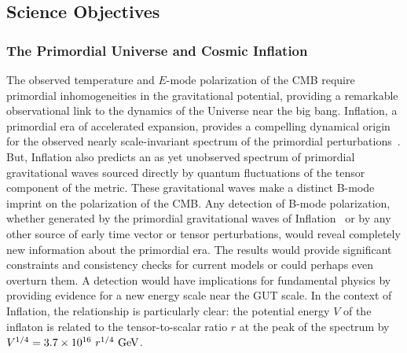 
\subsection{Science Objectives}
\label{sec:science}

\vspace{-0.05in}
 
\subsubsection{The Primordial Universe and Cosmic Inflation}

\vspace{-0.05in}

The observed temperature and $E$-mode polarization of the \ac{CMB} require primordial inhomogeneities in the 
gravitational potential, providing a remarkable observational link to the dynamics of the Universe near the big bang.
Inflation, a primordial era of accelerated expansion, provides a compelling 
dynamical origin for the observed nearly scale-invariant spectrum of the primordial perturbations~\cite{guth81,linde82,albrecht82,sato81,kolb94}. 
But, Inflation also predicts an as yet unobserved spectrum of primordial gravitational waves sourced directly by 
quantum fluctuations of the tensor component of the metric. These gravitational waves make a distinct B-mode imprint on the polarization of the \ac{CMB}. 
Any detection of B-mode polarization, whether generated by the primordial gravitational waves of 
Inflation~\cite{kamionkowski97a,zaldarriaga97} or by any other source of early time vector or tensor perturbations, 
would reveal completely new information about the primordial era. The results would provide significant constraints 
and consistency checks for current models or could perhaps even overturn them. A detection would have 
implications for fundamental physics by providing evidence for a new energy scale near the GUT scale. 
In the context of Inflation, the relationship is particularly clear: the 
potential energy $V$ of the inflaton is related to the tensor-to-scalar ratio $r$ at the peak of the 
spectrum by $V^{1/4} = 3.7 \times 10^{16} \ r^{1/4}\,\, {\rm GeV}$. 


